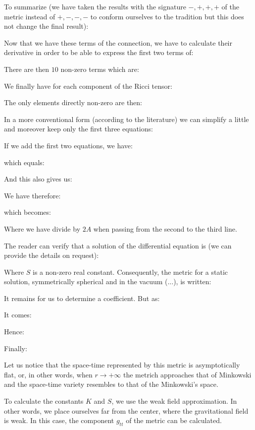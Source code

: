 	
	
	
	
	
	
	
	
	
	
	To summarize (we have taken the results with the signature $-, +, +, +$ of the metric instead of $+, -, -, -$ to conform ourselves to the tradition but this does not change the final result):
	
	Now that we have these terms of the connection, we have to calculate their derivative in order to be able to express the first two terms of:
	
	There are then $10$ non-zero terms which are:
	
	We finally have for each component of the Ricci tensor:
	
	The only elements directly non-zero are then:
	
	In a more conventional form (according to the literature) we can simplify a little and moreover keep only the first three equations:
	
	If we add the first two equations, we have:
	
	which equals:
	
	And this also gives us:
	
	We have therefore:
	
	which becomes:
	
	Where we have divide by $2A$ when passing from the second to the third line.

	The reader can verify that a solution of the differential equation is (we can provide the details on request):
	
	Where $S$ is a non-zero real constant. Consequently, the metric for a static solution, symmetrically spherical and in the vacuum (...), is written:
	
	It remains for us to determine a coefficient. But as:
	
	It comes:
	
	Hence:
	
	Finally:
	
	Let us notice that the space-time represented by this metric is asymptotically flat, or, in other words, when $r\rightarrow +\infty$ the metrich approaches that of Minkowski and the space-time variety resembles to that of the Minkowski's space.

	To calculate the constants $K$ and $S$, we use the weak field approximation. In other words, we place ourselves far from the center, where the gravitational field is weak. In this case, the component $g_{tt}$ of the metric can be calculated.

